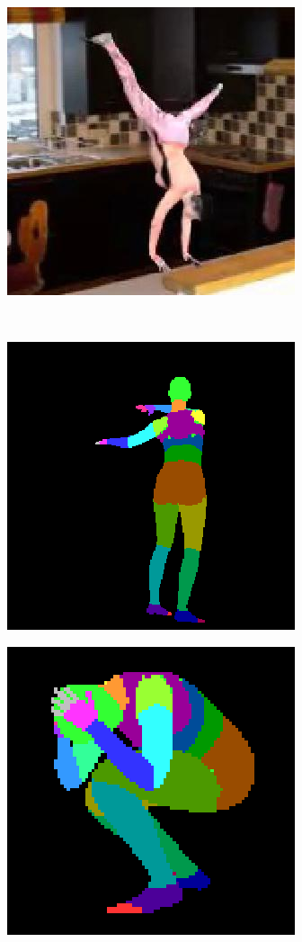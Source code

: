 \begin{figure}
\begin{subfigure}{.19\textwidth}
\end{subfigure}
\begin{subfigure}{.19\textwidth}
  \centering
  \includegraphics[scale=0.3]{ung_144_02_c0006_2.jpg}
\end{subfigure}\\
\begin{subfigure}{.2\textwidth}
\centering
  \includegraphics[scale=0.3]{80_15_c0002_segm_85.png}
\end{subfigure}%
\begin{subfigure}{.19\textwidth}
  \centering
  \includegraphics[scale=0.3]{ung_77_09_c0001_segm_67.png}

\end{subfigure}
\end{figure}

